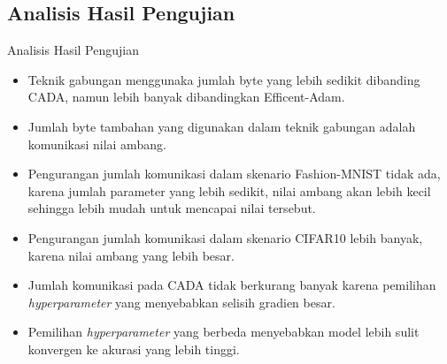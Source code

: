 \subsection{Analisis Hasil Pengujian}
\begin{frame}{Analisis Hasil Pengujian}
  \begin{itemize}
    \item Teknik gabungan menggunaka jumlah byte yang lebih sedikit dibanding CADA, namun lebih banyak dibandingkan Efficent-Adam.
    \item Jumlah byte tambahan yang digunakan dalam teknik gabungan adalah komunikasi nilai ambang.
    \item Pengurangan jumlah komunikasi dalam skenario Fashion-MNIST tidak ada, karena jumlah parameter yang lebih sedikit, nilai ambang akan lebih kecil sehingga lebih mudah untuk mencapai nilai tersebut.
    \item Pengurangan jumlah komunikasi dalam skenario CIFAR10 lebih banyak, karena nilai ambang yang lebih besar.
    \item Jumlah komunikasi pada CADA tidak berkurang banyak karena pemilihan \textit{hyperparameter} yang menyebabkan selisih gradien besar.
    \item Pemilihan \textit{hyperparameter} yang berbeda menyebabkan model lebih sulit konvergen ke akurasi yang lebih tinggi.
  \end{itemize}
\end{frame}
